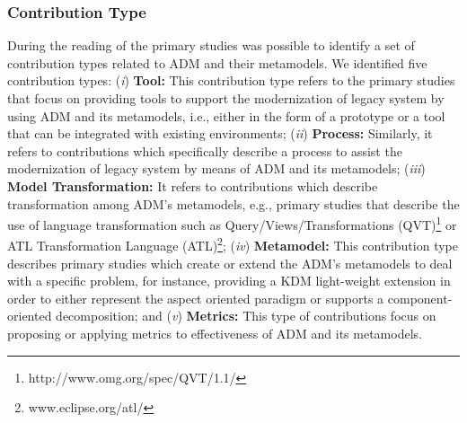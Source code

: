 

\subsubsection{Contribution Type}


During the reading of the primary studies was possible to identify a set of contribution types related to ADM and their metamodels. We identified five contribution types: (\textit{i}) \textbf{Tool:} This contribution type refers to the primary studies that focus on providing tools to support the modernization of legacy system by using ADM and its metamodels, i.e., either in the form of a prototype or a tool that can be integrated with existing environments; (\textit{ii}) \textbf{Process:} Similarly, it refers to contributions which specifically describe a process to assist the modernization of legacy system by means of ADM and its metamodels; (\textit{iii}) \textbf{Model Transformation:} It refers to contributions which describe transformation among ADM's metamodels, e.g., primary studies that describe the use of language transformation such as Query/Views/Transformations (QVT)\footnote{http://www.omg.org/spec/QVT/1.1/} or ATL Transformation Language (ATL)\footnote{www.eclipse.org/atl/}; (\textit{iv}) \textbf{Metamodel:} This contribution type describes primary studies which create or extend the ADM's metamodels to deal with a specific problem, for instance, providing a KDM light-weight extension in order to either represent the aspect oriented paradigm or supports a component-oriented decomposition; and (\textit{v}) \textbf{Metrics:} This type of contributions focus on proposing or applying metrics to effectiveness of ADM and its metamodels.






